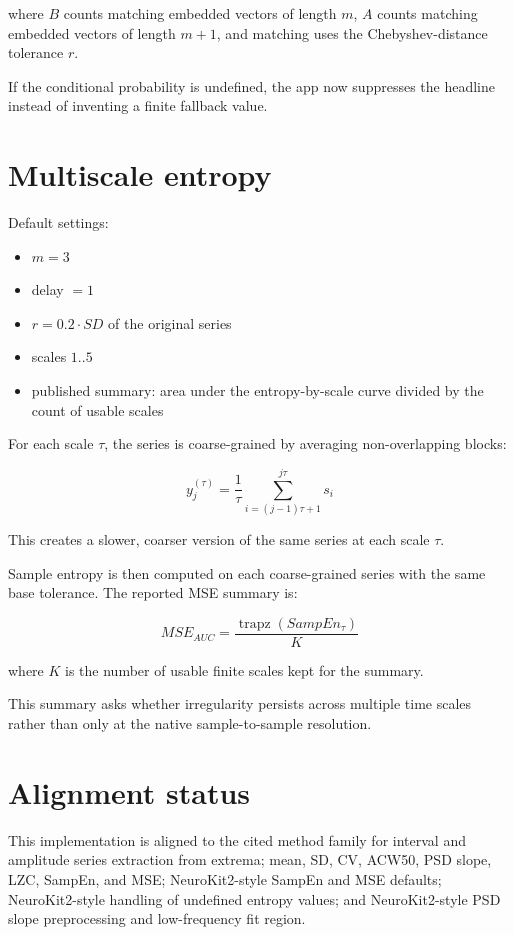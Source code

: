 \documentclass[11pt]{article}
\begin{document}
where $B$ counts matching embedded vectors of length $m$, $A$ counts matching
embedded vectors of length $m + 1$, and matching uses the Chebyshev-distance
tolerance $r$.

If the conditional probability is undefined, the app now suppresses the
headline instead of inventing a finite fallback value.

\section*{Multiscale entropy}

Default settings:

\begin{itemize}[leftmargin=1.5em]
\item $m = 3$
\item delay $= 1$
\item $r = 0.2 \cdot SD$ of the original series
\item scales $1..5$
\item published summary: area under the entropy-by-scale curve divided by the count of usable scales
\end{itemize}

For each scale $\tau$, the series is coarse-grained by averaging
non-overlapping blocks:

\[
y_j^{(\tau)} = \frac{1}{\tau}\sum_{i=(j-1)\tau + 1}^{j\tau} s_i
\]

This creates a slower, coarser version of the same series at each scale $\tau$.

Sample entropy is then computed on each coarse-grained series with the same
base tolerance. The reported MSE summary is:

\[
MSE_{AUC} = \frac{\operatorname{trapz}(SampEn_{\tau})}{K}
\]

where $K$ is the number of usable finite scales kept for the summary.

This summary asks whether irregularity persists across multiple time scales
rather than only at the native sample-to-sample resolution.

\section*{Alignment status}

This implementation is aligned to the cited method family for interval and
amplitude series extraction from extrema; mean, SD, CV, ACW50, PSD slope, LZC,
SampEn, and MSE; NeuroKit2-style SampEn and MSE defaults; NeuroKit2-style
handling of undefined entropy values; and NeuroKit2-style PSD slope
preprocessing and low-frequency fit region.
\end{document}
